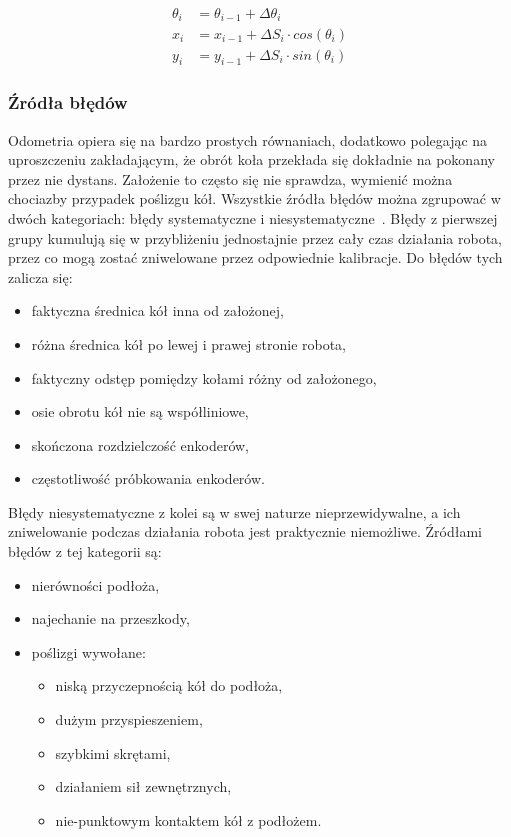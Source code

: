 \begin{align*}
\theta_i &= \theta_{i-1} + \Delta \theta_i \\
x_i &= x_{i-1} + \Delta S_i \cdot cos(\theta_i) \\ 
y_i &= y_{i-1} + \Delta S_i \cdot sin(\theta_i) 
\end{align*}


\subsubsection{Źródła błędów}

Odometria opiera się na bardzo prostych równaniach, dodatkowo polegając na
uproszczeniu zakładającym, że obrót koła przekłada się dokładnie na pokonany
przez nie dystans. Założenie to często się nie sprawdza, wymienić można
chociazby przypadek poślizgu kół. Wszystkie źródła błędów można zgrupować w
dwóch kategoriach: błędy systematyczne i niesystematyczne~\cite{whereami}.
Błędy z pierwszej grupy kumulują się w przybliżeniu jednostajnie przez cały czas
działania robota, przez co mogą zostać zniwelowane przez odpowiednie kalibracje.
Do błędów tych zalicza się:
\begin{itemize}
  \item faktyczna średnica kół inna od założonej,
  \item różna średnica kół po lewej i prawej stronie robota,
  \item faktyczny odstęp pomiędzy kołami różny od założonego,
  \item osie obrotu kół nie są współliniowe,
  \item skończona rozdzielczość enkoderów,
  \item częstotliwość próbkowania enkoderów.
\end{itemize}

Błędy niesystematyczne z kolei są w swej naturze nieprzewidywalne, a ich
zniwelowanie podczas działania robota jest praktycznie niemożliwe. Źródłami
błędów z tej kategorii są:
\begin{itemize}
  \item nierówności podłoża,
  \item najechanie na przeszkody,
  \item poślizgi wywołane:
  \begin{itemize}
    \item niską przyczepnością kół do podłoża,
    \item dużym przyspieszeniem,
    \item szybkimi skrętami,
    \item działaniem sił zewnętrznych,
    \item nie-punktowym kontaktem kół z podłożem.
  \end{itemize}
\end{itemize}


